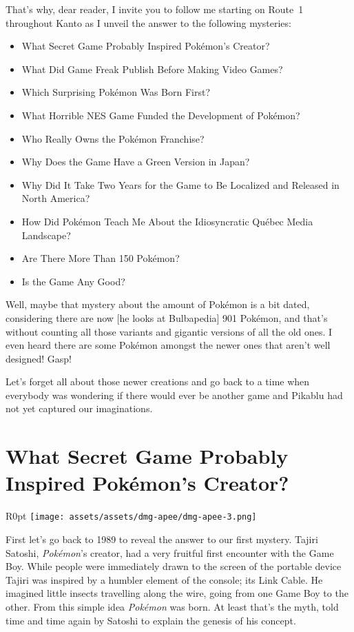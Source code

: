 \documentclass{book}
\begin{document}
That’s why, dear reader, I invite you to follow me starting on Route 1 throughout Kanto as I unveil the answer to the following mysteries:

\begin{itemize} \setlength\itemsep{-0.4em}
\item What Secret Game Probably Inspired Pokémon’s Creator?
\item What Did Game Freak Publish Before Making Video Games?
\item Which Surprising Pokémon Was Born First?
\item What Horrible NES Game Funded the Development of Pokémon?
\item Who Really Owns the Pokémon Franchise?
\item Why Does the Game Have a Green Version in Japan?
\item Why Did It Take Two Years for the Game to Be Localized and Released in North America?
\item How Did Pokémon Teach Me About the Idiosyncratic Québec Media Landscape?
\item Are There More Than 150 Pokémon?
\item Is the Game Any Good?
\end{itemize}\noindent

Well, maybe that mystery about the amount of Pokémon is a bit dated, considering there are now [he looks at Bulbapedia] 901 Pokémon, and that’s without counting all those variants and gigantic versions of all the old ones. I even heard there are some Pokémon amongst the newer ones that aren’t well designed! Gasp!

Let’s forget all about those newer creations and go back to a time when everybody was wondering if there would ever be another game and Pikablu had not yet captured our imaginations.

\FloatBarrier\needspace{10mm}\section*{What Secret Game Probably Inspired Pokémon’s Creator?}\nopagebreak[4]
\begin{wrapfigure}{R}{0pt} \texttt{[image: assets/assets/dmg-apee/dmg-apee-3.png]}\end{wrapfigure}
First let’s go back to 1989 to reveal the answer to our first mystery. Tajiri Satoshi, \emph{Pokémon}’s creator, had a very fruitful first encounter with the Game Boy. While people were immediately drawn to the screen of the portable device Tajiri was inspired by a humbler element of the console; its Link Cable. He imagined little insects travelling along the wire, going from one Game Boy to the other. From this simple idea \emph{Pokémon} was born. At least that’s the myth, told time and time again by Satoshi to explain the genesis of his concept.
\end{document}
